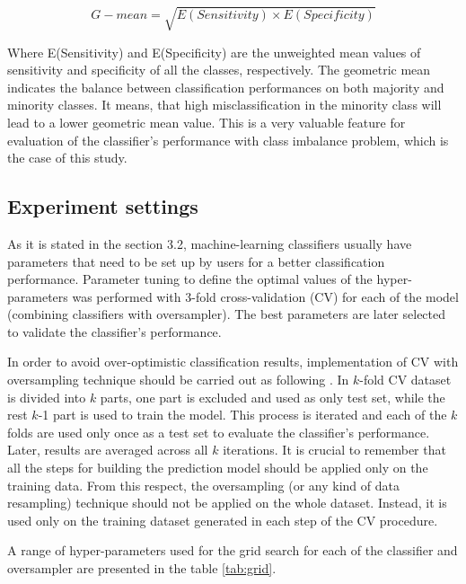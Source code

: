 \documentclass[parskip=full]{scrartcl}
\begin{document}
\begin{itemize}
	\begin{equation}
	G{-}mean = \sqrt{E(Sensitivity) \times E(Specificity)}
	\end{equation}

	Where E(Sensitivity) and E(Specificity) are the unweighted mean values of
	sensitivity and specificity of all the classes, respectively. The geometric
	mean indicates the balance between classification performances on both
	majority and minority classes. It means, that high misclassification in the
	minority class will lead to a lower geometric mean value. This is a very
	valuable feature for evaluation of the classifier's performance with class
	imbalance problem, which is the case of this study.

\end{itemize}

\subsection{Experiment settings}

As it is stated in the section 3.2, machine-learning classifiers usually have
parameters that need to be set up by users for a better classification
performance. Parameter tuning to define the optimal values of the
hyper-parameters was performed with 3-fold cross-validation (CV) for each of the
model (combining classifiers with oversampler). The best parameters are later
selected to validate the classifier's performance.

In order to avoid over-optimistic classification results, implementation of CV
with oversampling technique should be carried out as following \cite{Lusa2015}.
In $k$-fold CV dataset is divided into $k$ parts, one part is excluded and used
as only test set, while the rest $k$-1 part is used to train the model. This
process is iterated and each of the $k$ folds are used only once as a test set
to evaluate the classifier's performance. Later, results are averaged across all
$k$ iterations. It is crucial to remember that all the steps for building the
prediction model should be applied only on the training data. From this respect,
the oversampling (or any kind of data resampling) technique should not be
applied on the whole dataset. Instead, it is used only on the training dataset
generated in each step of the CV procedure.

A range of hyper-parameters used for the grid search for each of the classifier
and oversampler are presented in the table \ref{tab:grid}.
\end{document}
